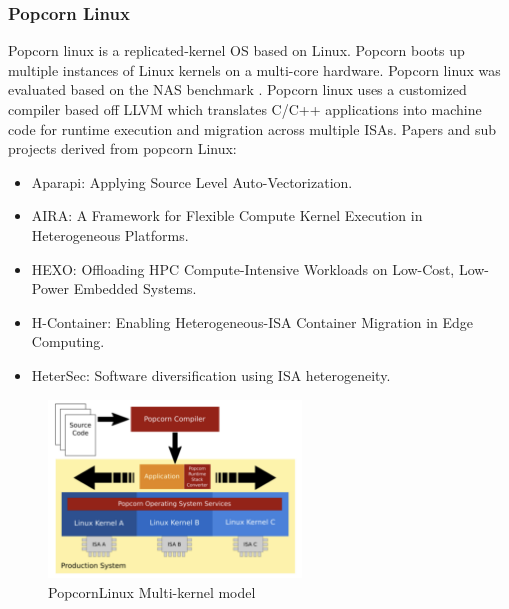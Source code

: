 \subsubsection{Popcorn Linux} %
Popcorn\cite{PopcornLinux} linux is a replicated-kernel OS based on Linux. Popcorn 
boots up multiple instances of Linux kernels on a 
multi-core hardware. Popcorn linux was evaluated 
based on the NAS benchmark \cite{NAS}. Popcorn 
linux uses a customized compiler based 
off LLVM which translates C/C++ applications 
into machine code for runtime execution and migration 
across multiple ISAs. Papers and sub projects 
derived from popcorn Linux: 
\begin{itemize}
  \item Aparapi\cite{APARI}: Applying Source Level Auto-Vectorization.
  \item AIRA\cite{AIRA}: A Framework for Flexible Compute Kernel Execution in Heterogeneous Platforms.
  \item HEXO\cite{HEXO}: Offloading HPC Compute-Intensive Workloads on Low-Cost, Low-Power Embedded Systems.
  \item H-Container\cite{EdgeContainer}: Enabling Heterogeneous-ISA Container Migration in Edge Computing.
  \item HeterSec\cite{HeterSec}: Software diversification using ISA heterogeneity.
\end{itemize}

\begin{figure}[htbp!] 
  \centering    
  \includegraphics[width=0.6\textwidth]{FigsMultikernel/popcornLinux}
  \caption[Multi-kernel]{PopcornLinux Multi-kernel model \cite{PopcornLinux}}
  \label{fig:PopcornLinux}
  \end{figure}





